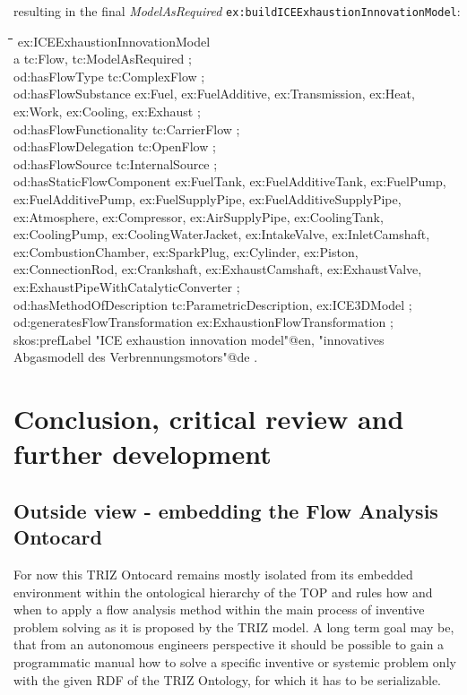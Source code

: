 \documentclass[a4paper,11pt]{article}
\newenvironment{code}{\tt \begin{tabbing}
\hskip12pt\=\hskip12pt\=\hskip12pt\=\hskip12pt\=\hskip5cm\=\hskip5cm\=\kill}
{\end{tabbing}}
\begin{document}
    resulting in the final \emph{ModelAsRequired} 
    \texttt{ex:buildICEExhaustionInnovationModel}:
    \begin{code}
    ex:ICEExhaustionInnovationModel \\
    \> a tc:Flow, tc:ModelAsRequired ; \\
    \> od:hasFlowType tc:ComplexFlow ; \\
    \> od:hasFlowSubstance ex:Fuel, ex:FuelAdditive, ex:Transmission, ex:Heat,  \\
    \> ex:Work, ex:Cooling, ex:Exhaust ; \\
    \> od:hasFlowFunctionality tc:CarrierFlow ; \\
    \> od:hasFlowDelegation tc:OpenFlow ; \\
    \> od:hasFlowSource tc:InternalSource ; \\
    \> od:hasStaticFlowComponent ex:FuelTank, ex:FuelAdditiveTank, ex:FuelPump, \\
    \> ex:FuelAdditivePump, ex:FuelSupplyPipe, ex:FuelAdditiveSupplyPipe, \\
    \> ex:Atmosphere, ex:Compressor, ex:AirSupplyPipe, ex:CoolingTank, \\
    \> ex:CoolingPump, ex:CoolingWaterJacket, ex:IntakeValve, ex:InletCamshaft,\\
    \> ex:CombustionChamber, ex:SparkPlug, ex:Cylinder, ex:Piston, \\
    \> ex:ConnectionRod, ex:Crankshaft, ex:ExhaustCamshaft, ex:ExhaustValve,\\
    \> ex:ExhaustPipeWithCatalyticConverter ; \\
    \> od:hasMethodOfDescription tc:ParametricDescription, ex:ICE3DModel ; \\
    \> od:generatesFlowTransformation ex:ExhaustionFlowTransformation ; \\
    \> skos:prefLabel "ICE exhaustion innovation model"@en, "innovatives  \\
    \> Abgasmodell des Verbrennungsmotors"@de . \\
    \end{code}
    \newpage
    \section{Conclusion, critical review and further development}
        \subsection{Outside view - embedding the Flow Analysis Ontocard}
        For now this TRIZ Ontocard remains mostly isolated from its embedded 
        environment within the ontological hierarchy of the TOP and rules 
        how and when to apply a flow analysis method within the main process 
        of inventive problem solving as it is proposed by the TRIZ model. A 
        long term goal may be, that from an autonomous engineers perspective it
        should be possible to gain a programmatic manual how to solve a 
        specific inventive or systemic problem only with the given RDF of the 
        TRIZ Ontology, for which it has to be serializable.
\end{document}
